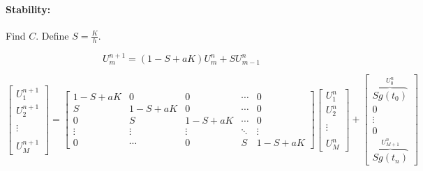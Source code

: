 \paragraph{Stability:}
Find \(C\). Define \( S = \frac{K}{h} \).

\[
  U_m^{n+1} = (1 - S + aK)U_m^n + SU_{m-1}^n
\]

\[
  \begin{bmatrix}
    U_1^{n+1} \\
    U_2^{n+1} \\
    \\
    \vdots    \\
    \\
    U_M^{n+1}
  \end{bmatrix}
  =
  \begin{bmatrix}
    1 - S + aK & 0          & 0          & \cdots & 0          \\
    S          & 1 - S + aK & 0          & \cdots & 0          \\
    0          & S          & 1 - S + aK & \cdots & 0          \\
    \vdots     & \vdots     & \vdots     & \ddots & \vdots     \\
    0          & \cdots     & 0          & S      & 1 - S + aK
  \end{bmatrix}
  \begin{bmatrix}
    U_1^n  \\
    U_2^n  \\
    \\
    \vdots \\
    \\
    U_M^n
  \end{bmatrix}
  +
  \begin{bmatrix}
    \overbrace{S g(t_0)}^{U_0^n} \\
    0                            \\
    \vdots                       \\
    0                            \\
    \overbrace{S g(t_n)}^{U_{M+1}^n}
  \end{bmatrix}
\]


